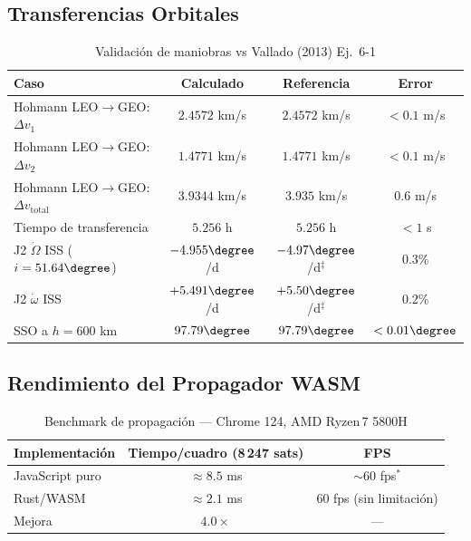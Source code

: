 \documentclass[12pt,a4paper]{article}
\newcommand{\dv}{\Delta v}
\newcommand{\dvtot}{\Delta v_{\text{total}}}
\begin{document}
\subsection{Transferencias Orbitales}

\begin{table}[H]
\centering
\caption{Validaci\'on de maniobras vs Vallado (2013) Ej.~6-1}
\label{tab:maneuver_val}
\begin{tabular}{lccc}
\toprule
\textbf{Caso} & \textbf{Calculado} & \textbf{Referencia} & \textbf{Error} \\
\midrule
Hohmann LEO$\to$GEO: $\dv_1$ & $2.4572$ km/s & $2.4572$ km/s & $<0.1$ m/s \\
Hohmann LEO$\to$GEO: $\dv_2$ & $1.4771$ km/s & $1.4771$ km/s & $<0.1$ m/s \\
Hohmann LEO$\to$GEO: $\dvtot$ & $3.9344$ km/s & $3.935$ km/s  & $0.6$ m/s  \\
Tiempo de transferencia        & $5.256$ h     & $5.256$ h     & $< 1$ s    \\
\midrule
J2 $\dot\Omega$ ISS ($i=51.64\degree$) & $-4.955\degree$/d & $-4.97\degree$/d$^\ddag$ & $0.3\%$ \\
J2 $\dot\omega$ ISS                    & $+5.491\degree$/d & $+5.50\degree$/d$^\ddag$ & $0.2\%$ \\
SSO a $h=600$ km                       & $97.79\degree$    & $97.79\degree$            & $<0.01\degree$ \\
\bottomrule
\end{tabular}
\par{}
\end{table}

\subsection{Rendimiento del Propagador WASM}

\begin{table}[H]
\centering
\caption{Benchmark de propagaci\'on --- Chrome 124, AMD Ryzen\,7 5800H}
\label{tab:perf}
\begin{tabular}{lcc}
\toprule
\textbf{Implementaci\'on} & \textbf{Tiempo/cuadro} (8\,247 sats) & \textbf{FPS} \\
\midrule
JavaScript puro & $\approx 8.5$ ms & $\sim$60 fps$^*$ \\
Rust/WASM       & $\approx 2.1$ ms & 60 fps (sin limitaci\'on) \\
\midrule
Mejora          & $\mathbf{4.0\times}$ & --- \\
\bottomrule
\end{tabular}
\par{}
\end{table}
\end{document}
